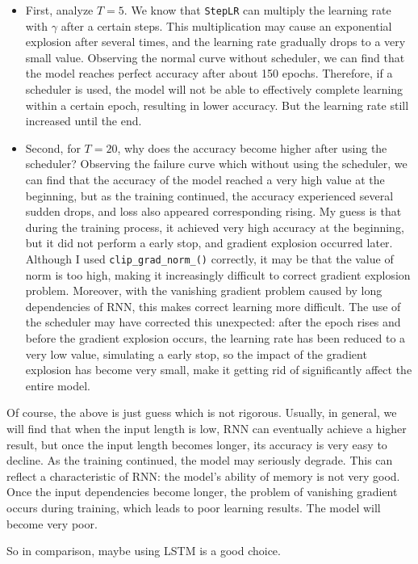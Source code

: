 \begin{itemize}
  \item {First, analyze $T=5$. We know that \texttt{StepLR} can multiply the learning rate with $\gamma$ after a certain steps.
      This multiplication may cause an exponential explosion after several times, and the learning rate gradually drops to a very small value.
      Observing the normal curve without scheduler, we can find that the model reaches perfect accuracy after about 150 epochs. Therefore, if a scheduler is used, the model will not be able to effectively complete learning within a certain epoch, resulting in lower accuracy.
      But the learning rate still increased until the end.
    }

  \item {Second, for $T=20$, why does the accuracy become higher after using the scheduler?
      Observing the failure curve which without using the scheduler, we can find that the accuracy of the model reached a very high value at the beginning, but as the training continued, the accuracy experienced several sudden drops, and loss also appeared corresponding rising.
      My guess is that during the training process, it achieved very high accuracy at the beginning, but it did not perform a early stop, and gradient explosion occurred later.
      Although I used \texttt{clip\_grad\_norm\_()} correctly, it may be that the value of norm is too high, making it increasingly difficult to correct gradient explosion problem.
      Moreover, with the vanishing gradient problem caused by long dependencies of RNN, this makes correct learning more difficult.
      The use of the scheduler may have corrected this unexpected: after the epoch rises and before the gradient explosion occurs, the learning rate has been reduced to a very low value, simulating a early stop,
      so the impact of the gradient explosion has become very small, make it getting rid of significantly affect the entire model.
    }
\end{itemize}

Of course, the above is just guess which is not rigorous.
Usually, in general, we will find that when the input length is low, RNN can eventually achieve a higher result, but once the input length becomes longer, its accuracy is very easy to decline.
As the training continued, the model may seriously degrade.
This can reflect a characteristic of RNN: the model's ability of memory is not very good. Once the input dependencies become longer, the problem of vanishing gradient occurs during training, which leads to poor learning results.
The model will become very poor.

So in comparison, maybe using LSTM is a good choice.
